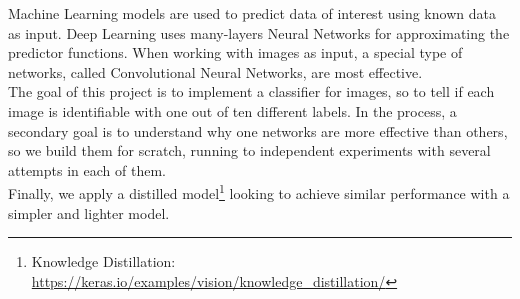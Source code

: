 \begin{center}
    \begin{minipage}{0.85\textwidth}
        Machine Learning models are used to predict data of interest using known data as input.
        Deep Learning uses many-layers Neural Networks for approximating the predictor functions.
        When working with images as input, a special type of networks, called Convolutional Neural Networks, are most effective.\\
        The goal of this project is to implement a classifier for images,
        so to tell if each image is identifiable with one out of ten different labels.
        In the process, a secondary goal is to understand why one networks are more effective than others,
        so we build them for scratch, running to independent experiments with several attempts in each of them.\\
        Finally, we apply a distilled model\footnote{Knowledge Distillation: \href{https://keras.io/examples/vision/knowledge\_distillation/}{https://keras.io/examples/vision/knowledge\_distillation/}}
        looking to achieve similar performance with a simpler and lighter model.
    \end{minipage}
\end{center}